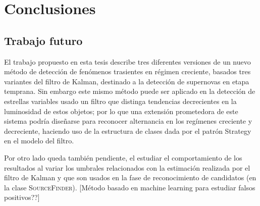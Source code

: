 \chapter{Conclusiones}
\label{ch:conclusion}



\section{Trabajo futuro}
El trabajo propuesto en esta tesis describe tres diferentes versiones de un nuevo m\'etodo de detecci\'on de fen\'omenos trasientes en r\'egimen creciente, basados tres variantes del filtro de Kalman, destinado a la detecci\'on de supernovas en etapa temprana. Sin embargo este mismo m\'etodo puede ser aplicado en la detecci\'on de estrellas variables usado un filtro que distinga tendencias decrecientes en la luminosidad de estos objetos; por lo que una extensi\'on prometedora de este sistema podr\'ia dise\~narse  para reconocer alternancia en los reg\'imenes creciente y decreciente, haciendo uso de la estructura de clases dada por el patr\'on Strategy en el modelo del filtro.
\bigskip

Por otro lado queda tambi\'en pendiente, el estudiar el comportamiento de los resultados al variar los umbrales relacionados con la estimaci\'on realizada por el filtro de Kalman y que son usados en la fase de reconocimiento de candidatos (en la clase \textsc{SourceFinder}). [M\'etodo basado en machine learning para estudiar falsos positivos??] 


